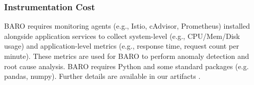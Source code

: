 \begin{table}[ht]
\centering
\begin{minipage}[t]{0.48\textwidth}
\centering
\caption{Average anomaly detection run time (in seconds)}
\vspace{-0.3cm}
\label{tab:running-time-ad}

\end{minipage}
\hfill
\begin{minipage}[t]{0.48\textwidth}
\centering
\caption{Average RCA run time (in seconds)}
\vspace{-0.2cm}
\label{tab:running-time-rca}
\end{minipage}
\vspace{-0.3cm}
\end{table}


\subsubsection{Instrumentation Cost}

BARO requires monitoring agents (e.g., Istio, cAdvisor, Prometheus) installed alongside application services to collect system-level (e.g., CPU/Mem/Disk usage) and application-level metrics (e.g., response time, request count per minute). These metrics are used for BARO to perform anomaly detection and root cause analysis. BARO requires Python and some standard packages (e.g. pandas, numpy). Further details are available in our artifacts \cite{barogithub, barogithubzenodo}.
